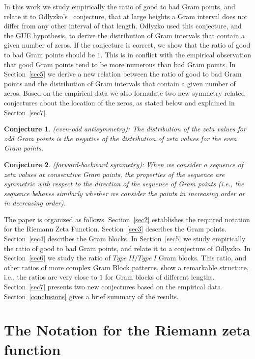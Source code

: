 \documentclass[twoside]{article}
\newtheorem*{mydef-non}{Conjecture}
\theoremstyle{definition}
\begin{document}
In this work we study empirically the ratio of good to bad Gram points, and relate it to Odlyzko's~\cite{Odlyzko 1992} conjecture,  that at large heights a Gram interval does not differ from any other interval of that length. Odlyzko used this conjecture, and the GUE hypothesis, to derive the distribution of Gram intervals that contain a given number of zeros.
If the conjecture is correct, we show that the ratio of good to bad Gram points should be $1$. This is in conflict with the empirical observation that good Gram points tend to be more numerous than bad Gram points. In Section~\ref{sec5} we derive a new relation between the ratio of good to bad Gram points and the distribution of Gram intervals that contain a given number of zeros.  Based on the empirical data we also formulate two new symmetry related conjectures about the location of the zeros, as stated below and explained in Section~\ref{sec7}.

\begin{mydef-non}\label{antisymmetry0}
(even-odd antisymmetry): The distribution of the zeta values for odd Gram points is the negative of the distribution of zeta values for the even Gram points.
\end{mydef-non}
\begin{mydef-non}\label{symmetry0}
(forward-backward symmetry): When we consider a sequence of zeta values at consecutive Gram points, the properties of the sequence are symmetric with respect to the direction of the sequence of Gram points (i.e., the sequence behaves similarly whether we consider the points in increasing order or in decreasing order).
\end{mydef-non}

The paper is organized as follows.
Section~\ref{sec2} establishes the required notation for the 
Riemann Zeta Function. 
Section~\ref{sec3} describes the Gram points. 
Section~\ref{sec4} describes the Gram blocks. 
In Section~\ref{sec5} we study empirically the ratio of good to bad Gram points, and relate it to a conjecture of Odlyzko. 
In Section~\ref{sec6} we study the ratio of $Type~II/Type~I$ Gram blocks. This ratio, and other ratios of more complex Gram Block patterns, show a
remarkable structure, i.e., the ratios are very close to $1$ for Gram blocks of different lengths.
Section~\ref{sec7} presents two new conjectures based on the empirical data. 
Section~\ref{conclusions} gives a brief summary of the results. 

\section{\label{sec2}The Notation for the Riemann zeta function }
\end{document}

